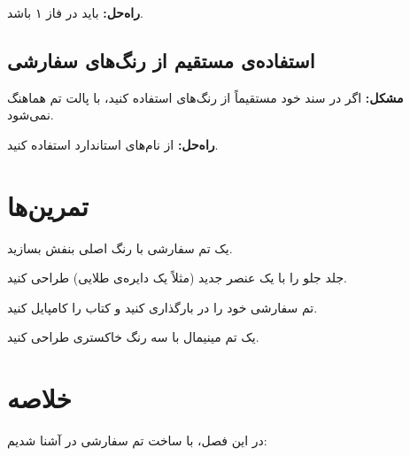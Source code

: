 \textbf{راه‌حل:} 
باید در فاز ۱  باشد.

\subsection{استفاده‌ی مستقیم از رنگ‌های سفارشی}
\label{sec:custom-theme-mistake-direct}

\textbf{مشکل:} اگر در سند خود مستقیماً از
رنگ‌های  استفاده کنید، با پالت
 تم هماهنگ نمی‌شود.

\textbf{راه‌حل:} از نام‌های استاندارد
 استفاده کنید.

\section{تمرین‌ها}
\label{sec:custom-theme-exercises}

\begin{exercise}
    یک تم سفارشی با رنگ اصلی بنفش بسازید.
    \label{exc:custom-theme-purple}
\end{exercise}

\begin{exercise}
    جلد جلو را با یک عنصر جدید (مثلاً یک
    دایره‌ی طلایی) طراحی کنید.
    \label{exc:custom-theme-cover}
\end{exercise}

\begin{exercise}
    تم سفارشی خود را در 
    بارگذاری کنید و کتاب را کامپایل کنید.
    \label{exc:custom-theme-load}
\end{exercise}

\begin{exercise}
    یک تم مینیمال با سه رنگ خاکستری طراحی
    کنید.
    \label{exc:custom-theme-minimal}
\end{exercise}

\section{خلاصه}
\label{sec:custom-theme-summary}

در این فصل، با ساخت تم سفارشی در 
آشنا شدیم:

